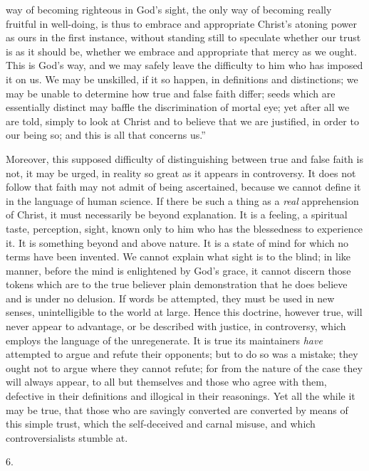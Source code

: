 way of becoming righteous in God's sight, the only way of becoming
really fruitful in well-doing, is thus to embrace and appropriate
Christ's atoning power as ours in the first instance, without standing
still to speculate whether our trust is as it should be, whether we
embrace and appropriate that mercy as we ought. This is God's way, and
we may safely leave the difficulty to him who has imposed it on us. We
may be unskilled, if it so happen, in definitions and distinctions; we
may be unable to determine how true and false faith differ; seeds
which are essentially distinct may baffle the discrimination of mortal
eye; yet after all we are told, simply to look at Christ and to
believe that we are justified, in order to our being so; and this is
all that concerns us.''

Moreover, this supposed difficulty of distinguishing between true
and false faith is not, it may be urged, in reality so great as it
appears in controversy. It does not follow that faith may not admit of
being ascertained, because we cannot define it in the language of
human science. If there be such a thing as a \emph{real}
apprehension of Christ, it must necessarily be beyond explanation. It
is a feeling, a spiritual taste, perception, sight, known only to him
who has the blessedness to experience it. It is something beyond and
above nature. It is a state of mind for which no terms have been
invented. We cannot explain what sight is to the blind; in like
manner, before the mind is enlightened by God's grace, it cannot
discern those tokens which are to the true believer plain
demonstration that he does believe and is under no delusion. If words
be attempted, they must be used in new senses, unintelligible to the
world at large. Hence this doctrine, however true, will never appear
to advantage, or be described with justice, in controversy, which
employs the language of the unregenerate. It is true its maintainers \emph{have}
attempted to argue and refute their opponents; but to do so was a
mistake; they ought not to argue where they cannot refute; for from
the nature of the case they will always appear, to all but themselves
and those who agree with them, defective in their definitions and
illogical in their reasonings. Yet all the while it may be true, that
those who are savingly converted are converted by means of this simple
trust, which the self-deceived and carnal misuse, and which
controversialists stumble at.

6.

